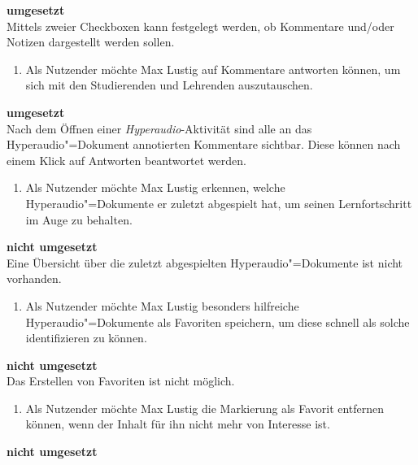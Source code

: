 \vspace{-0.1cm}
\textbf{umgesetzt}\\
Mittels zweier Checkboxen kann festgelegt werden, ob Kommentare und/oder Notizen dargestellt werden sollen.
\vspace{0.25cm}
\begin{enumerate}[resume*]
\item \label{US-Antwort-S-Eval} Als Nutzender möchte Max Lustig auf Kommentare antworten können, um sich mit den Studierenden und Lehrenden auszutauschen.
\end{enumerate}
\vspace{-0.1cm}
\textbf{umgesetzt}\\
Nach dem Öffnen einer \textit{Hyperaudio}-Aktivität sind alle an das Hyperaudio"=Dokument annotierten Kommentare sichtbar. Diese können nach einem Klick auf \glqq Antworten\grqq{} beantwortet werden.
\vspace{0.25cm}
\begin{enumerate}[resume*]
\item \label{US-Uebersicht-Letzte-Eval} Als Nutzender möchte Max Lustig erkennen, welche Hyperaudio"=Dokumente er zuletzt abgespielt hat, um seinen Lernfortschritt im Auge zu behalten.
\end{enumerate}
\vspace{-0.1cm}
\textbf{nicht umgesetzt}\\
Eine Übersicht über die zuletzt abgespielten Hyperaudio"=Dokumente ist nicht vorhanden.
\vspace{0.25cm}
\begin{enumerate}[resume*]
\item \label{US-Favoriten-Eval} Als Nutzender möchte Max Lustig besonders hilfreiche Hyperaudio"=Dokumente als Favoriten speichern, um diese schnell als solche identifizieren zu können.
\end{enumerate}
\vspace{-0.1cm}
\textbf{nicht umgesetzt}\\
Das Erstellen von Favoriten ist nicht möglich.
\vspace{0.25cm}
\begin{enumerate}[resume*]
\item \label{US-Favoriten-Loeschen-Eval} Als Nutzender möchte Max Lustig die Markierung als Favorit entfernen können, wenn der Inhalt für ihn nicht mehr von Interesse ist.
\end{enumerate}
\vspace{-0.1cm}
\textbf{nicht umgesetzt}\\
